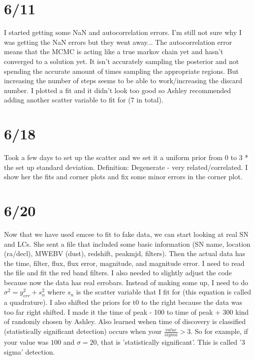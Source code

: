 \documentclass[12pt]{article}
\begin{document}
\section{6/11}
I started getting some NaN and autocorrelation errors. I'm still not sure why I was getting the NaN errors but they went away... The autocorrelation error means that the MCMC is acting like a true markov chain yet and hasn't converged to a solution yet. It isn't accurately sampling the posterior and not spending the accurate amount of times sampling the appropriate regions. But increasing the number of steps seems to be able to work/increasing the discard number. I plotted a fit and it didn't look too good so Ashley recommended adding another scatter variable to fit for (7 in total). 

\section{6/18}
Took a few days to set up the scatter and we set it a uniform prior from 0 to 3 * the set up standard deviation. Definition: Degenerate - very related/correlated. I show her the fits and corner plots and fix some minor errors in the corner plot. 


\section{6/20}
Now that we have used emcee to fit to fake data, we can start looking at real SN and LCs. She sent a file that included some basic information (SN name, location (ra/decl), MWEBV (dust), redshift, peakmjd, filters). Then the actual data has the time, filter, flux, flux error, magnitude, and magnitude error. I need to read the file and fit the red band filters. I also needed to slightly adjust the code because now the data has real errobars. Instead of making some up, I need to do $\sigma ^2 = y_{err}^2 + s_n^2$ where $s_n$ is the scatter variable that I fit for (this equation is called a quadrature). I also shifted the priors for t0 to the right because the data was too far right shifted. I made it the time of peak - 100 to time of peak + 300 kind of randomly chosen by Ashley. Also learned wehen time of discovery is classified (statistically significant detection) occurs when your $\frac{value}{sigma} >3$. So for example, if your value was $100$ and $\sigma = 20$, that is 'statistically significant'. This is called '3 sigma' detection. 
\end{document}
